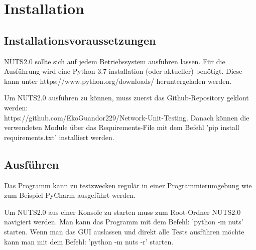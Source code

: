 \documentclass[
	ngerman,
	toc=listof, %
	toc=bibliography, %
	footnotes=multiple, %
	parskip=half, %
	numbers=noendperiod %
]{scrartcl}
\newcommand{\vorlagenOrdner}{../99_Vorlagen} %
\begin{document}
\thispagestyle{plain}

\cleardoublepage


{}
\tableofcontents
\cleardoublepage

\let\stdsection\section
\renewcommand\section{\clearpage\stdsection}

\section{Installation}
	\subsection{Installationsvoraussetzungen}
	NUTS2.0 sollte sich auf jedem Betriebssystem ausführen lassen.
	Für die Ausführung wird eine Python 3.7 installation (oder aktueller) benötigt.
	Diese kann unter https://www.python.org/downloads/ heruntergeladen werden.

	Um NUTS2.0 ausführen zu können, muss zuerst das Github-Repository geklont werden:\\
	https://github.com/EkoGuandor229/Network-Unit-Testing. 
	Danach können die verwendeten Module über das Requirements-File mit dem Befehl
	'pip install requirements.txt' installiert werden.

	\subsection{Ausführen}
	Das Programm kann zu testzwecken regulär in einer Programmierumgebung 
	wie zum Beispiel PyCharm ausgeführt werden.

	Um NUTS2.0 aus einer Konsole zu starten muss zum Root-Ordner NUTS2.0 navigiert werden. 
	Man kann das Programm mit dem Befehl: 'python -m nuts' starten. 
	Wenn man das GUI auslassen und direkt alle Tests ausführen möchte kann
	man mit dem Befehl: 'python -m nuts -r' starten.
\end{document}
